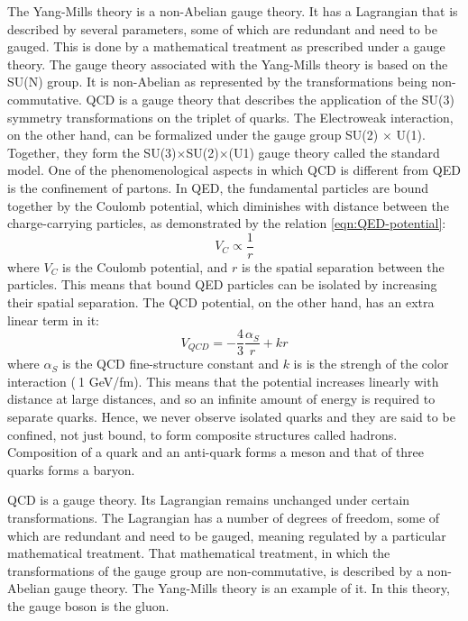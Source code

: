 The Yang-Mills theory is a non-Abelian gauge theory. It has a Lagrangian that is described by several parameters, some of which are redundant and need to be gauged. This is done by a mathematical treatment as prescribed under a gauge theory. The gauge theory associated with the Yang-Mills theory is based on the SU(N) group. It is non-Abelian as represented by the transformations being non-commutative. QCD is a gauge theory that describes the application of the SU(3) symmetry transformations on the triplet of quarks. The Electroweak interaction, on the other hand, can be formalized under the gauge group SU(2) $\times$ U(1). Together, they form the SU(3)$\times$SU(2)$\times$(U1) gauge theory called the standard model.
One of the phenomenological aspects in which QCD is different from QED is the confinement of partons. In QED, the fundamental particles are bound together by the Coulomb potential, which diminishes with distance between the charge-carrying particles, as demonstrated by the relation \ref{eqn:QED-potential}:
\begin{equation}\label{eqn:QED-potential}
V_{C}\propto\frac{1}{r} 
\end{equation}
where $V_{C}$ is the Coulomb potential, and $r$ is the spatial separation between the particles. This means that bound QED particles can be isolated by increasing their spatial separation. The QCD potential, on the other hand, has an extra linear term in it:
\begin{equation}\label{eqn:QCD-potential}
V_{QCD} = -\frac{4}{3}\frac{\alpha_{S}}{r} + {k}{r} 
\end{equation}
where $\alpha_{S}$ is the QCD fine-structure constant and $k$ is is the strengh of the color interaction ($~$1 GeV/fm). This means that the potential increases linearly with distance at large distances, and so an infinite amount of energy is required to separate quarks. Hence, we never observe isolated quarks and they are said to be confined, not just bound, to form composite structures called hadrons.\cite{0954-3899-32-3-R01} Composition of a quark and an anti-quark forms a meson and that of three quarks forms a baryon.

QCD is a gauge theory. Its Lagrangian remains unchanged under certain transformations. The Lagrangian has a number of degrees of freedom, some of which are redundant and need to be gauged, meaning regulated by a particular mathematical treatment. That mathematical treatment, in which the transformations of the gauge group are non-commutative, is described by a non-Abelian gauge theory. The Yang-Mills theory is an example of it. In this theory, the gauge boson is the gluon. 

